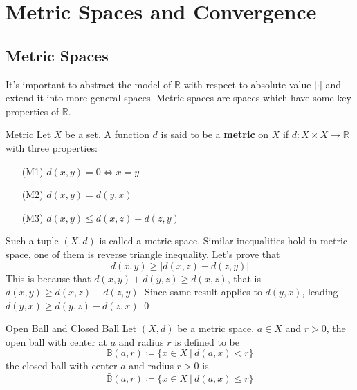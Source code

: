 \documentclass{article}
\begin{document}
\section{Metric Spaces and Convergence}
\subsection{Metric Spaces}
It's important to abstract the model of $\mathbb{R}$ with respect to absolute value $|\cdot|$ and extend it into more general spaces. Metric spaces are spaces which have some key properties of $\mathbb{R}$.
\begin{defin}{Metric}
    Let $X$ be a set. A function $d$ is said to be a \textbf{metric} on $X$ if $d : X \times X \rightarrow \mathbb{R}$ with three properties:
    \begin{itemize}
        \item[(M1)] $d(x,y) = 0 \Longleftrightarrow x = y$
        \item[(M2)] $d(x,y) = d(y,x)$
        \item[(M3)] $d(x,y) \leq d(x,z) + d(z,y)$  
    \end{itemize}
\end{defin}
Such a tuple $(X, d)$ is called a metric space. Similar inequalities hold in metric space, one of them is reverse triangle inequality. Let's prove that 
$$
d(x,y) \geq |d(x,z) - d(z,y)|
$$
This is because that $d(x,y) + d(y,z) \geq d(x,z)$, that is $d(x,y) \geq d(x,z) - d(z,y)$. Since same result applies to $d(y,x)$, leading 
$d(y,x) \geq d(y,z) - d(z,x)$.\qed
\begin{defin}{Open Ball and Closed Ball}
    Let $(X,d)$ be a metric space. $a \in X$ and $r > 0$, the open ball with center at $a$ and radius $r$ is defined to be
    $$
    \mathbb{B}(a,r) \coloneq \{x \in X\ |\ d(a,x) < r\}
    $$
    the closed ball with center $a$ and radius $r > 0$ is 
    $$
    \bar{\mathbb{B}}(a,r) \coloneq \{x \in X\ |\ d(a,x) \leq r\}
    $$ 
\end{defin}
\end{document}
